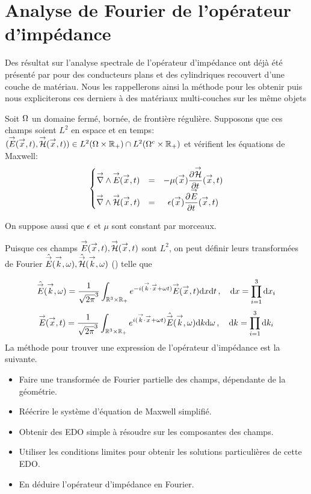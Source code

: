 \section{Analyse de Fourier de l'opérateur d'impédance}

Des résultat sur l'analyse spectrale de l'opérateur d'impédance ont déjà été présenté par \cite{hoppe_impedance_1995} pour des conducteurs plans et des cylindriques recouvert d'une couche de matériau.
Nous les rappellerons ainsi la méthode pour les obtenir puis nous expliciterons ces derniers à des matériaux multi-couches sur les même objets


Soit \(\Omega\) un domaine fermé, bornée, de frontière régulière. Supposons que ces champs soient \(L^2\) en espace et en temps: \(({\overset{\rightarrow}{E}}({\overset{\rightarrow}{x}},t),{\overset{\rightarrow}{\mathcal{H}}}({\overset{\rightarrow}{x}},t)) \in L^2(\Omega \times \mathbb R_+) \cap L^2(\Omega^c\times\mathbb R_+)\) et vérifient les équations de Maxwell:
\begin{equation}
    \left\lbrace 
    \begin{matrix}
    {\overset{\rightarrow}{\nabla}}\wedge {\overset{\rightarrow}{E}}({\overset{\rightarrow}{x}},t) &=& -\mu({\overset{\rightarrow}{x}}) \dfrac{\partial^{{}} {\overset{\rightarrow}{\mathcal{H}}}}{{\partial t}^{{}}}({\overset{\rightarrow}{x}},t) \\
    {\overset{\rightarrow}{\nabla}}\wedge {\overset{\rightarrow}{\mathcal{H}}}({\overset{\rightarrow}{x}},t) &=& \epsilon({\overset{\rightarrow}{x}}) \dfrac{\partial^{{}} {\overset{\rightarrow}{E}}}{{\partial t}^{{}}}({\overset{\rightarrow}{x}},t)
    \end{matrix}
    \right.
\end{equation}

On suppose aussi que \(\epsilon\) et \(\mu\) sont constant par morceaux.

Puisque ces champs \({\overset{\rightarrow}{E}}({\overset{\rightarrow}{x}},t),{\overset{\rightarrow}{\mathcal{H}}}({\overset{\rightarrow}{x}},t)\) sont \(L^2\), on peut définir leurs transformées de Fourier \(\hat{{\overset{\rightarrow}{E}}}({\overset{\rightarrow}{k}},\omega), \hat{{\overset{\rightarrow}{\mathcal{H}}}}({\overset{\rightarrow}{k}},\omega)\) (\cite[Théorème de Plancherel, p.~153]{yosida_functional_1995}) telle que

\begin{equation}
    \hat{{\overset{\rightarrow}{E}}} ({\overset{\rightarrow}{k}},\omega) = \dfrac{1}{\sqrt{2\pi}^3}\int_{\mathbb R^3\times\mathbb R_+} e^{-i({\overset{\rightarrow}{k}} \cdot {\overset{\rightarrow}{x}}+\omega t)}{\overset{\rightarrow}{E}}({\overset{\rightarrow}{x}},t) \mathrm{d}{x}\mathrm{d}{t}\,, \quad \mathrm{d} x = \prod\limits_{i=1}^3 \mathrm{d}{x}_i
\end{equation}
\begin{equation}
    {\overset{\rightarrow}{E}}({\overset{\rightarrow}{x}},t) = \dfrac{1}{\sqrt{2\pi}^3}\int_{\mathbb R^3\times\mathbb R_+} e^{i({\overset{\rightarrow}{k}} \cdot {\overset{\rightarrow}{x}}+\omega t)}\hat{{\overset{\rightarrow}{E}}} ({\overset{\rightarrow}{k}},\omega) \mathrm{d}{k} \mathrm{d}{\omega}\,, \quad \mathrm{d} k = \prod\limits_{i=1}^3 \mathrm{d}{k}_i
\end{equation}
La méthode pour trouver une expression de l'opérateur d'impédance est la suivante.
\begin{itemize}
\item Faire une transformée de Fourier partielle des champs, dépendante de la géométrie.
\item Réécrire le système d'équation de Maxwell simplifié.
\item Obtenir des EDO simple à résoudre sur les composantes des champs.
\item Utiliser les conditions limites pour obtenir les solutions particulières de cette EDO. 
\item En déduire l'opérateur d'impédance en Fourier.
\end{itemize}


